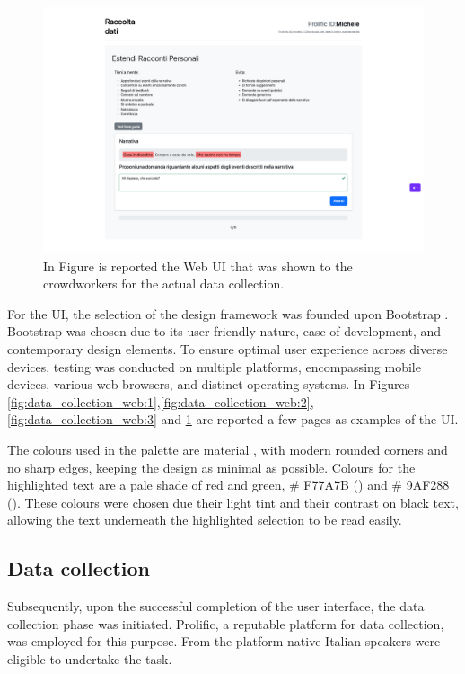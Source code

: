\begin{figure}[!htbp]
    \centering
    \includegraphics[width=1\linewidth]{assets//imgs/UI-datacollection.png}
    \caption{In Figure is reported the Web UI that was shown to the crowdworkers for the actual data collection.}
    \label{fig:data_collection_web:4}
\end{figure}

For the UI, the selection of the design framework was founded upon Bootstrap \cite{bootstrap}. Bootstrap was chosen due to its user-friendly nature, ease of development, and contemporary design elements. To ensure optimal user experience across diverse devices, testing was conducted on multiple platforms, encompassing mobile devices, various web browsers, and distinct operating systems.
In Figures \ref{fig:data_collection_web:1},\ref{fig:data_collection_web:2},\ref{fig:data_collection_web:3} and \ref{fig:data_collection_web:4} are reported a few pages as examples of the UI.

The colours used in the palette are material \cite{material}, with modern rounded corners and no sharp edges, keeping the design as minimal as possible. Colours for the highlighted text are a pale shade of red and green, \# F77A7B (\redbg{\hspace{1em}}) and \# 9AF288 (\greenbg{\hspace{1em}}). These colours were chosen due their light tint and their contrast on black text, allowing the text underneath the highlighted selection to be read easily.


\subsection{Data collection}
\label{cha:methodology-data-collection}
Subsequently, upon the successful completion of the user interface, the data collection phase was initiated. Prolific, a reputable platform \cite{prolific} for data collection, was employed for this purpose. From the platform native Italian speakers were eligible to undertake the task.

